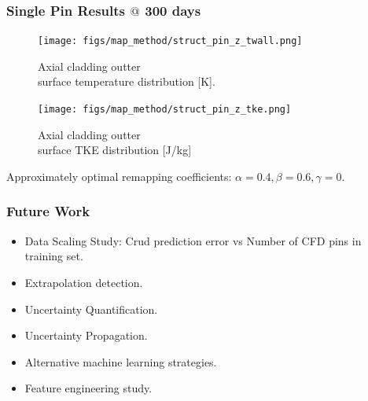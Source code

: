 \documentclass[t, pdftex]{beamer}
\begin{document}
\begin{frame}
\frametitle{Single Pin Results $@$ 300 days}
    \begin{figure}
        \centering
        \begin{minipage}{.5\textwidth}
            \centering
            \texttt{[image: figs/map\_method/struct\_pin\_z\_twall.png]}
            \caption{Axial cladding outter \\ surface temperature distribution [K].}
        \end{minipage}%
        \begin{minipage}{.5\textwidth}
            \centering
            \texttt{[image: figs/map\_method/struct\_pin\_z\_tke.png]}
            \caption{ Axial cladding outter \\ surface TKE distribution [J/kg]}
        \end{minipage}
    \end{figure}
Approximately optimal remapping coefficients: $\alpha=0.4, \beta=0.6, \gamma=0$.  
\end{frame}


\begin{frame}[shrink=10]
\frametitle{Future Work}
\begin{itemize}
\item Data Scaling Study:  Crud prediction error vs Number of CFD pins in training set.
\item Extrapolation detection.
\item Uncertainty Quantification.
\item Uncertainty Propagation.
\item Alternative machine learning strategies.
\item Feature engineering study.
\end{itemize}
\end{frame}
\end{document}
